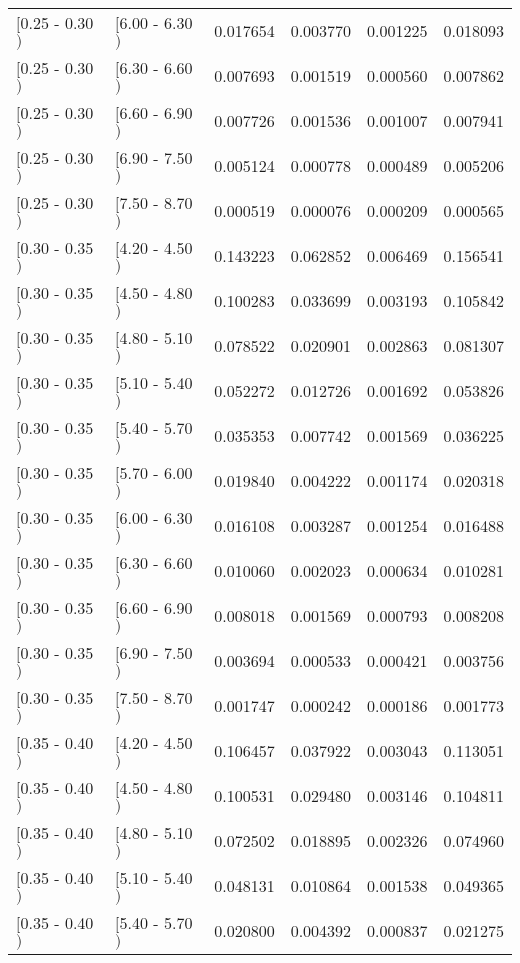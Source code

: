 \begin{longtable}{| l | l | r | r | r | r |}
$[$0.25 - 0.30$)$ & $[$6.00 - 6.30$)$ & 0.017654 & 0.003770 & 0.001225 & 0.018093 \\
$[$0.25 - 0.30$)$ & $[$6.30 - 6.60$)$ & 0.007693 & 0.001519 & 0.000560 & 0.007862 \\
$[$0.25 - 0.30$)$ & $[$6.60 - 6.90$)$ & 0.007726 & 0.001536 & 0.001007 & 0.007941 \\
$[$0.25 - 0.30$)$ & $[$6.90 - 7.50$)$ & 0.005124 & 0.000778 & 0.000489 & 0.005206 \\
$[$0.25 - 0.30$)$ & $[$7.50 - 8.70$)$ & 0.000519 & 0.000076 & 0.000209 & 0.000565 \\
$[$0.30 - 0.35$)$ & $[$4.20 - 4.50$)$ & 0.143223 & 0.062852 & 0.006469 & 0.156541 \\
$[$0.30 - 0.35$)$ & $[$4.50 - 4.80$)$ & 0.100283 & 0.033699 & 0.003193 & 0.105842 \\
$[$0.30 - 0.35$)$ & $[$4.80 - 5.10$)$ & 0.078522 & 0.020901 & 0.002863 & 0.081307 \\
$[$0.30 - 0.35$)$ & $[$5.10 - 5.40$)$ & 0.052272 & 0.012726 & 0.001692 & 0.053826 \\
$[$0.30 - 0.35$)$ & $[$5.40 - 5.70$)$ & 0.035353 & 0.007742 & 0.001569 & 0.036225 \\
$[$0.30 - 0.35$)$ & $[$5.70 - 6.00$)$ & 0.019840 & 0.004222 & 0.001174 & 0.020318 \\
$[$0.30 - 0.35$)$ & $[$6.00 - 6.30$)$ & 0.016108 & 0.003287 & 0.001254 & 0.016488 \\
$[$0.30 - 0.35$)$ & $[$6.30 - 6.60$)$ & 0.010060 & 0.002023 & 0.000634 & 0.010281 \\
$[$0.30 - 0.35$)$ & $[$6.60 - 6.90$)$ & 0.008018 & 0.001569 & 0.000793 & 0.008208 \\
$[$0.30 - 0.35$)$ & $[$6.90 - 7.50$)$ & 0.003694 & 0.000533 & 0.000421 & 0.003756 \\
$[$0.30 - 0.35$)$ & $[$7.50 - 8.70$)$ & 0.001747 & 0.000242 & 0.000186 & 0.001773 \\
$[$0.35 - 0.40$)$ & $[$4.20 - 4.50$)$ & 0.106457 & 0.037922 & 0.003043 & 0.113051 \\
$[$0.35 - 0.40$)$ & $[$4.50 - 4.80$)$ & 0.100531 & 0.029480 & 0.003146 & 0.104811 \\
$[$0.35 - 0.40$)$ & $[$4.80 - 5.10$)$ & 0.072502 & 0.018895 & 0.002326 & 0.074960 \\
$[$0.35 - 0.40$)$ & $[$5.10 - 5.40$)$ & 0.048131 & 0.010864 & 0.001538 & 0.049365 \\
$[$0.35 - 0.40$)$ & $[$5.40 - 5.70$)$ & 0.020800 & 0.004392 & 0.000837 & 0.021275 \\

\end{longtable}
